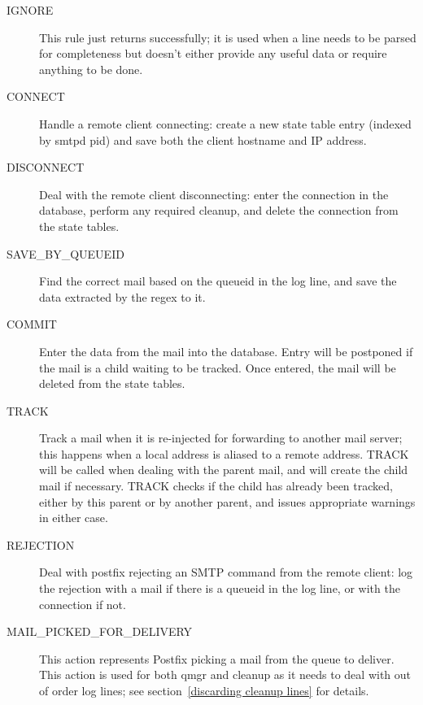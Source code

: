 \documentclass[a4paper,12pt,draft]{article}
\begin{document}
\begin{description}

    \item [IGNORE] This rule just returns successfully; it is used when a
        line needs to be parsed for completeness but doesn't either provide
        any useful data or require anything to be done.

    \item [CONNECT] Handle a remote client connecting: create a new state
        table entry (indexed by smtpd pid) and save both the client
        hostname and IP address.

    \item [DISCONNECT] Deal with the remote client disconnecting: enter the
        connection in the database, perform any required cleanup, and
        delete the connection from the state tables.

    \item [SAVE\_BY\_QUEUEID] Find the correct mail based on the queueid in
        the log line, and save the data extracted by the regex to it.

    \item [COMMIT] Enter the data from the mail into the database. Entry
        will be postponed if the mail is a child waiting to be tracked.
        Once entered, the mail will be deleted from the state tables.

    \item [TRACK] Track a mail when it is re-injected for forwarding to
        another mail server; this happens when a local address is aliased
        to a remote address.  TRACK will be called when dealing with the
        parent mail, and will create the child mail if necessary. TRACK
        checks if the child has already been tracked, either by this parent
        or by another parent, and issues appropriate warnings in either
        case.

    \item [REJECTION] Deal with postfix rejecting an SMTP command from the
        remote client: log the rejection with a mail if there is a queueid
        in the log line, or with the connection if not.

    \item [MAIL\_PICKED\_FOR\_DELIVERY] This action represents Postfix
        picking a mail from the queue to deliver. This action is used for
        both qmgr and cleanup as it needs to deal with out of order log
        lines; see section~\ref{discarding cleanup lines} for details.


\end{description}
\end{document}
